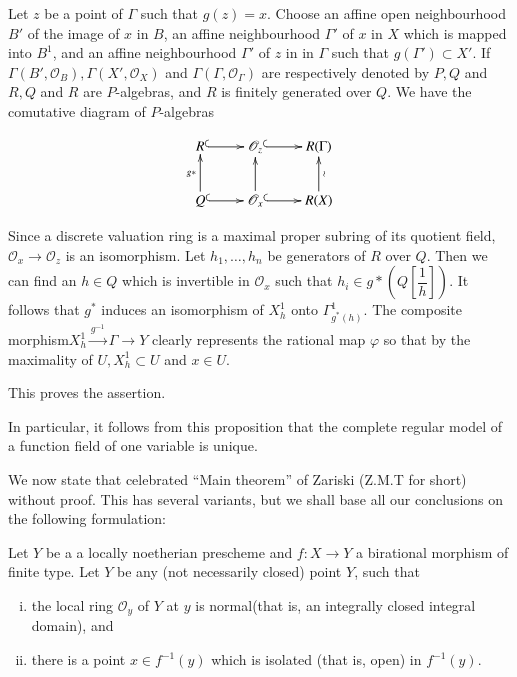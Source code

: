 Let $z$ be a point of $\Gamma$ such that $g(z) = x$. Choose an affine
open neighbourhood $B'$ of the image of $x$ in $B$, an affine
neighbourhood $\Gamma'$ of $x$ in $X$ which is mapped into $B^1$, and
an affine neighbourhood $\Gamma'$ of $z$ in in $\Gamma$ such that $g(\Gamma')
\subset X'$. If $\Gamma(B', \mathscr{O}_B), \Gamma (X',
\mathscr{O}_X)$ and $\Gamma (\Gamma, \mathscr{O}_\Gamma)$ are
respectively denoted by $P, Q$ and $R, Q$ and $R$ are $P$-algebras,
and $R$ is finitely generated over $Q$. We have the comutative diagram
of $P$-algebras  

\[
\xymatrix{R \ar@{^{(}->}[r]  & \mathscr{O}_z  \ar@{^{(}->}[r] & R (\Gamma) \\
Q \ar[u]^{g*} \ar@{^{(}->}[r] & \ar[u] \mathscr{O}_x \ar@{^{(}->}[r] &
R(X) \ar[u]_\wr  
}
\]

Since a discrete valuation ring is a maximal proper subring of its
quotient field, $\mathscr{O}_x \rightarrow \mathscr{O}_z$ is an
isomorphism. Let $h_1,\ldots , h_n$ be generators of $R$ over $Q$. Then
we can find an $h \in Q$ which is invertible in $\mathscr{O}_x$ such
that $h_i \in g*\left(Q \left[ \dfrac{1}{h} \right]\right)$. It
follows that $g^*$ 
induces an isomorphism of $X^1_h$ onto $\Gamma^1_{g^*(h)}$. The
composite morphism\pageoriginale $X^1_h \xrightarrow{g^{-1}} \Gamma \rightarrow Y$
clearly represents the rational map $\varphi$ so that by the
maximality of $U, X^1_h \subset U $ and $x \in U$.  

This proves the assertion.

In particular, it follows from this proposition that the complete
regular model of a function field of one variable is unique.  

We now state that celebrated ``Main theorem'' of Zariski (Z.M.T for
short) without proof. This has several variants, but we shall base all
our conclusions on the following formulation: 
\begin{theorem*}[Zariski ]
  Let $Y$ be a a locally noetherian prescheme and $f: X \rightarrow Y$
  a birational morphism of finite type. Let $Y$ be any (not
  necessarily closed) point $Y$, such that  
  \begin{enumerate}[(i)]
  \item the local ring $\mathscr{O}_y$ of $Y$ at $y$ is normal(that
    is, an integrally closed integral domain), and  
  \item there is a point $x \in f^{-1} (y)$ which is isolated (that
    is, open) in $f^{-1}(y)$. 
  \end{enumerate}
\end{theorem*}

